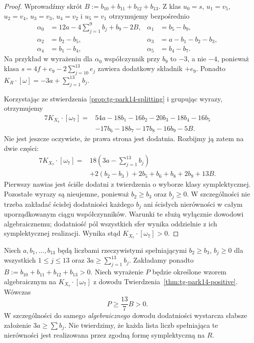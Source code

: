 \begin{proof}
Wprowadźmy skrót $B:=b_{10}+b_{11}+b_{12}+b_{13}$.
Z klas $u_0=s$, $u_1=v_5$, $u_2=v_4$, $u_3=v_3$,
$u_4=v_2$ i $u_5=v_1$ otrzymujemy bezpośrednio
\[
\begin{aligned}
\alpha_0&=12a-4\sum_{j=1}^{9}b_j+b_9-2B,
 &\alpha_1&=b_5-b_9,\\
\alpha_2&=b_2-b_5,
 &\alpha_3&=a-b_1-b_2-b_3,\\
\alpha_4&=b_1-b_4,
 &\alpha_5&=b_4-b_7.
\end{aligned}
\]
Na przykład w wyrażeniu dla $\alpha_0$ współczynnik
przy $b_9$ to $-3$, a nie $-4$, ponieważ klasa
$s=4f+e_9-2\sum_{j=10}^{13}e_j$ zawiera dodatkowy
składnik $+e_9$. Ponadto
$K_R\cdot[\omega]=-3a+\sum_{j=1}^{13}b_j$.

Korzystając ze stwierdzenia \ref{prop:tg-park14-splitting}
i grupując wyrazy, otrzymujemy
\[
\begin{aligned}
7K_{X_7}\cdot[\omega_7]
={}&54a-18b_1-16b_2-20b_3-18b_4-16b_5\\
 &-17b_6-18b_7-17b_8-16b_9-5B.
\end{aligned}
\]
Nie jest jeszcze oczywiste, że prawa strona jest dodatnia.
Rozbijmy ją zatem na dwie części:
\[
\begin{aligned}
7K_{X_7}\cdot[\omega_7]
={}&18\left(3a-\sum_{j=1}^{13}b_j\right)\\
 &+2(b_2-b_3)+2b_5+b_6+b_8+2b_9+13B.
\end{aligned}
\]
Pierwszy nawias jest ściśle dodatni z twierdzenia
o wyborze klasy symplektycznej. Pozostałe wyrazy
są nieujemne, ponieważ $b_2\ge b_3$ oraz $b_j\ge0$.
W szczególności nie trzeba zakładać ścisłej
dodatniości każdego $b_j$ ani ścisłych nierówności
w całym uporządkowanym ciągu współczynników.
Warunki te służą wyłącznie dowodowi algebraicznemu;
dodatniość pól wszystkich sfer wynika oddzielnie
z ich symplektycznej realizacji.
Wynika stąd $K_{X_7}\cdot[\omega_7]>0$.
\end{proof}

\begin{wniosek}
\label{cor:tg-park14-quantitative-positive}
Niech $a,b_1,\ldots,b_{13}$ będą liczbami
rzeczywistymi spełniającymi
$b_2\ge b_3$, $b_j\ge0$ dla wszystkich
$1\le j\le13$ oraz
$3a\ge\sum_{j=1}^{13}b_j$.
Zakładamy ponadto $B:=b_{10}+b_{11}+b_{12}+b_{13}>0$.
Niech wyrażenie $P$ będzie określone
wzorem algebraicznym na
$K_{X_7}\cdot[\omega_7]$
z dowodu Twierdzenia~\ref{thm:tg-park14-positive}.
Wówczas
\[
P\ge\frac{13}{7}B>0.
\]
W szczególności do samego
\emph{algebraicznego} dowodu dodatniości
wystarcza słabsze założenie
$3a\ge\sum b_j$.
Nie twierdzimy, że każda lista liczb
spełniająca te nierówności jest
realizowana przez zgodną formę
symplektyczną na $R$.
\end{wniosek}

